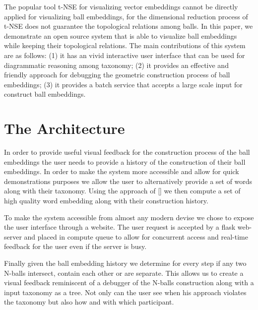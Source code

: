 \documentclass[runningheads]{llncs}
\begin{document}
The popular  tool t-NSE \cite{Maaten08} for visualizing vector embeddings cannot be directly applied for visualizing ball embeddings, for the dimensional reduction process of t-NSE does not guarantee the topological relations among balls. In this paper, we demonstrate an open source system that is able to visualize ball embeddings while keeping their topological relations. The main contributions of this system are as follows: (1) it has an vivid interactive user interface that can be used for diagrammatic reasoning among taxonomy; (2) it provides an effective and friendly approach for debugging the geometric construction process of ball embeddings; (3) it provides a batch service that accepts a large scale input for construct ball embeddings. 

\section{The Architecture}

In order to provide useful visual feedback for the construction process of the ball embeddings the user needs to provide a history of the construction of their ball embeddings. In order to make the system more accessible and allow for quick demonstrations purposes we allow the user to alternatively provide a set of words along with their taxonomy. Using the approach of [] we then compute a set of high quality word embedding along with their construction history.

To make the system accessible from almost any modern devise we chose to expose the user interface through a website. The user request is accepted by a flask web-server and placed in compute queue to allow for concurrent access and real-time feedback for the user even if the server is busy. 

Finally given the ball embedding history we determine for every step if any two N-balls intersect, contain each other or are separate. This allows us to create a visual feedback reminiscent of a debugger of the N-balls construction along with a input taxonomy as a tree. Not only can the user see when his approach violates the taxonomy but also how and with which participant.
\end{document}
